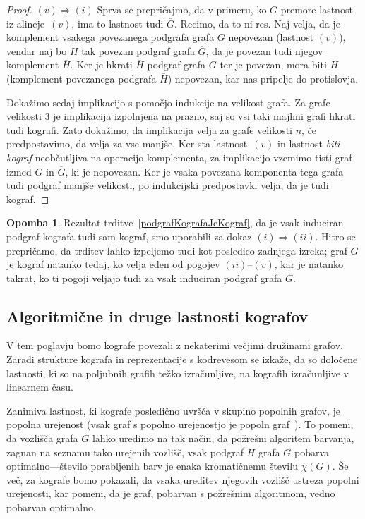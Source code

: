 \documentclass[12pt,a4paper,twoside]{article}
\theoremstyle{definition} %
\newtheorem{opomba}[definicija]{Opomba}
\theoremstyle{plain} %
\numberwithin{equation}{section}  %
\begin{document}
\begin{proof}
\medskip
$(v) \Rightarrow (i)$ Sprva se prepričajmo, da v primeru, ko $G$ premore lastnost iz alineje~$(v)$, ima to lastnost tudi $\overline{G}$. Recimo, da to ni res. Naj velja, da je komplement vsakega povezanega podgrafa grafa $G$ nepovezan (lastnost $(v)$), vendar naj bo $H$ tak povezan podgraf grafa $\overline{G}$, da je povezan tudi njegov komplement $\overline{H}$. Ker je hkrati $\overline{H}$ podgraf grafa $G$ ter je povezan, mora biti $H$ (komplement povezanega podgrafa $\overline{H}$) nepovezan, kar nas pripelje do protislovja.

\medskip
Dokažimo sedaj implikacijo s pomočjo indukcije na velikost grafa. Za grafe velikosti 3 je implikacija izpolnjena na prazno, saj so vsi taki majhni grafi hkrati tudi kografi. Zato dokažimo, da implikacija velja za grafe velikosti $n$, če predpostavimo, da velja za vse manjše. Ker sta lastnost~$(v)$ in lastnost \textit{biti kograf} neobčutljiva na operacijo komplementa, za implikacijo vzemimo tisti graf izmed $G$ in $\overline{G}$, ki je nepovezan. Ker je vsaka povezana komponenta tega grafa tudi podgraf manjše velikosti, po indukcijski predpostavki velja, da je tudi kograf.\end{proof}

\begin{opomba}
Rezultat trditve~\ref{podgrafKografaJeKograf}, da je vsak induciran podgraf kografa tudi sam kograf, smo uporabili za dokaz $(i) \Rightarrow (ii)$. Hitro se prepričamo, da trditev lahko izpeljemo tudi kot posledico zadnjega izreka; graf $G$ je kograf natanko tedaj, ko velja eden od pogojev $(ii)$--$(v)$, kar je natanko takrat, ko ti pogoji veljajo tudi za vsak induciran podgraf grafa $G$.
\end{opomba}

\subsection{Algoritmične in druge lastnosti kografov}\label{sec:algoritmicneInDrugeLastnosti}
V tem poglavju bomo kografe povezali z nekaterimi večjimi družinami grafov. Zaradi strukture kografa in reprezentacije s kodrevesom se izkaže, da so določene lastnosti, ki so na poljubnih grafih težko izračunljive, na kografih izračunljive v linearnem času.

Zanimiva lastnost, ki kografe posledično uvršča v skupino popolnih grafov,  je popolna urejenost (vsak graf s popolno urejenostjo je popoln graf~\cite{maffray2003coloration}). To pomeni, da vozlišča grafa $G$ lahko uredimo na tak način, da požrešni algoritem barvanja, zagnan na seznamu tako urejenih vozlišč, vsak podgraf $H$ grafa $G$ pobarva optimalno---število porabljenih barv je enaka kromatičnemu številu $\chi(G)$. Še več, za kografe bomo pokazali, da vsaka ureditev njegovih vozlišč ustreza popolni urejenosti, kar pomeni, da je graf, pobarvan s požrešnim algoritmom, vedno pobarvan optimalno.
\end{document}
